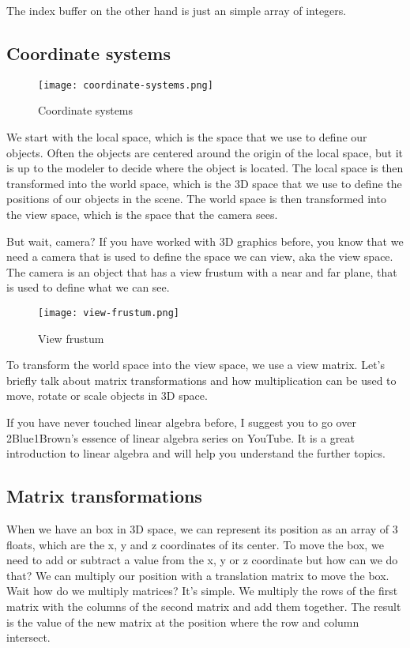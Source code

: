 \documentclass[12pt]{report} \usepackage{preamble}
\begin{document}
The index buffer on the other hand is just an simple array of integers.
\cite{vulkan-tutorial-index-buffer}


\subsection{Coordinate systems}

\begin{figure}[hbtp]
	\centering \texttt{[image: coordinate-systems.png]}
	\caption{Coordinate systems \cite{fig:view-frustum}}
\end{figure}
\floatbarrier

We start with the local space, which is the space that we use to define
our objects. Often the objects are centered around the origin of the
local space, but it is up to the modeler to decide where the object is
located. The local space is then transformed into the world space, which
is the 3D space that we use to define the positions of our objects in the scene.
The world space is then transformed into the view space, which is the space that the
camera sees. \cite{fig:view-frustum}

But wait, camera? If you have worked with 3D graphics before, you know
that we need a camera that is used to define the space we can view, aka
the view space. The camera is an object that has a view frustum
with a near and far plane, that is used to define what we can see.

\begin{figure}[hbtp]
	\centering \texttt{[image: view-frustum.png]}
	\caption{View frustum \cite{fig:view-frustum}}
\end{figure}
\floatbarrier

To transform the world space into the view space, we use a view matrix.
Let's briefly talk about matrix transformations and how multiplication
can be used to move, rotate or scale objects in 3D space.

If you have never touched linear algebra before, I suggest you to go over
2Blue1Brown's essence of linear algebra series on YouTube. It is a great
introduction to linear algebra and will help you understand the further topics.

\subsection{Matrix transformations}

When we have an box in 3D space, we can represent its position as an
array of 3 floats, which are the x, y and z coordinates of its center.
To move the box, we need to add or subtract a value from the x, y or
z coordinate but how can we do that? We can multiply our position with a translation matrix to
move the box. Wait how do we multiply matrices? It's simple. We multiply
the rows of the first matrix with the columns of the second matrix and add them
together. The result is the value of the new matrix at the position where the row and
column intersect.
\end{document}
